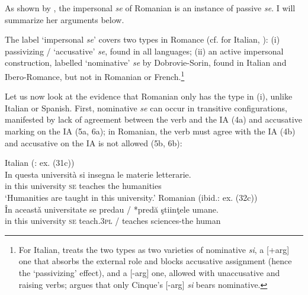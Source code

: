 \documentclass[output=paper]{langsci/langscibook}
\begin{document}
As shown by \citet{Dobrovie-Sorin1998}, the impersonal \textit{se} of Romanian is an instance of passive \textit{se}. I will summarize her arguments below.

The label ‘impersonal \textit{se}’ covers two types in Romance (cf. \citealt{Belletti1982,Manzini1986,Burzio1986} for Italian, \citealt{Dobrovie-Sorin1998,Dobrovie-Sorin2006,Dobrovie-Sorin2017}): (i) passivizing / ‘accusative’ \textit{se}, found in all languages; (ii) an active impersonal construction, labelled ‘nominative’ \textit{se} by Dobrovie-Sorin, found in Italian and Ibero-Romance, but not in Romanian or French.\footnote{For Italian, \citet{Cinque1988} treats the two types as two varieties of nominative \textit{si}, a [+arg] one that absorbs the external %
role and blocks accusative assignment (hence the ‘passivizing’ effect), and a [-arg] one, allowed with unaccusative and  raising verbs; \citet{Dobrovie-Sorin1998} argues that only Cinque’s [-arg] \textit{si} bears nominative.
} 

Let us now look at the evidence that Romanian only has the type in (i), unlike Italian or Spanish. First, nominative \textit{se} can occur in transitive configurations, manifested by lack of agreement between the verb and the IA (4a) and accusative marking on the IA (5a, 6a); in Romanian, the verb must agree with the IA (4b) and accusative on the IA is not allowed (5b, 6b):

\ea%
    \label{ex:giurgea:4}
    \ea  Italian (\citealt{Dobrovie-Sorin2017}: ex. (31c))\\
    \gll In questa università  si    insegna  le   materie letterarie.\\
         in this      university \textsc{se}   teaches   the humanities\\
    \glt ‘Humanities are taught in this university.’
    \ex Romanian (ibid.: ex. (32c))\\
    \gll În aceastǎ universitate se   predau   / *predă     ştiinţele        umane.\\
         in this      university     \textsc{se}  teach.\textsc{3pl} / teaches  sciences-the human \\
    \z
\z

\ea%
    \label{ex:giurgea:5}
    \z
\z    
\end{document}
